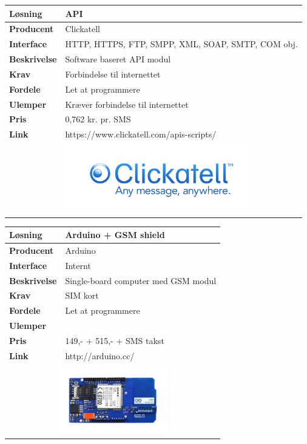 \begin{table}[H] \centering
	\label{tab:GSM2}
\begin{tabular}{|p{6cm}|p{8cm}|}
	\hline
		\textbf{Løsning}				&API \\ \hline
		\textbf{Producent} 			&Clickatell \\ \hline
		\textbf{Interface} 			&HTTP, HTTPS, FTP, SMPP, XML, SOAP, SMTP, COM obj.\\ \hline
		\textbf{Beskrivelse} 		&Software baseret API modul \\ \hline
		\textbf{Krav} 				&Forbindelse til internettet \\ \hline
		\textbf{Fordele}				&Let at programmere \\ \hline
		\textbf{Ulemper} 			&Kræver forbindelse til internettet \\ \hline
		\textbf{Pris} 				&0,762 kr. pr. SMS \\ \hline
		\textbf{Link} 				&https://www.clickatell.com/apis-scripts/ \\ \hline	
		\multicolumn{2}{|c|}{
			\includegraphics[height=3cm]{billeder/GSM_Clickatell}} \\ \hline	
\end{tabular}
\end{table}

\begin{table}[H] \centering
	\label{tab:GSM3}
\begin{tabular}{|p{6cm}|p{8cm}|}
	\hline
		\textbf{Løsning}				&Arduino + GSM shield \\ \hline
		\textbf{Producent} 			&Arduino \\ \hline
		\textbf{Interface} 			&Internt \\ \hline
		\textbf{Beskrivelse} 		&Single-board computer med GSM modul\\ \hline
		\textbf{Krav} 				&SIM kort \\ \hline
		\textbf{Fordele}				&Let at programmere \\ \hline
		\textbf{Ulemper} 			&\\ \hline
		\textbf{Pris} 				&149,- + 515,- + SMS takst\\ \hline
		\textbf{Link} 				&http://arduino.cc/ \\ \hline		
		\multicolumn{2}{|c|}{
			\includegraphics[height=3cm]{billeder/GSM_Arduino}} \\ \hline	
\end{tabular}
\end{table}